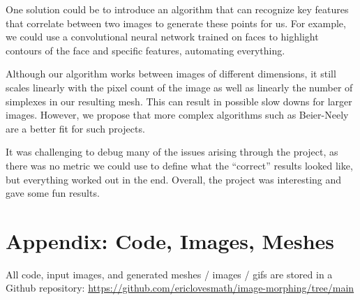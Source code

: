 \documentclass[a4paper]{article}
\begin{document}
One solution could be to introduce an algorithm that can recognize key features that correlate between two images to generate these points for us. For example, we could use a convolutional neural network trained on faces to highlight contours of the face and specific features, automating everything.

Although our algorithm works between images of different dimensions, it still scales linearly with the pixel count of the image as well as linearly the number of simplexes in our resulting mesh. This can result in possible slow downs for larger images. However, we propose that more complex algorithms such as Beier-Neely are a better fit for such projects.

It was challenging to debug many of the issues arising through the project, as there was no metric we could use to define what the ``correct'' results looked like, but everything worked out in the end. Overall, the project was interesting and gave some fun results.

\section*{Appendix: Code, Images, Meshes}

All code, input images, and generated meshes / images / gifs are stored in a Github repository: \href{https://github.com/ericlovesmath/image-morphing/tree/main}{https://github.com/ericlovesmath/image-morphing/tree/main}
\end{document}
